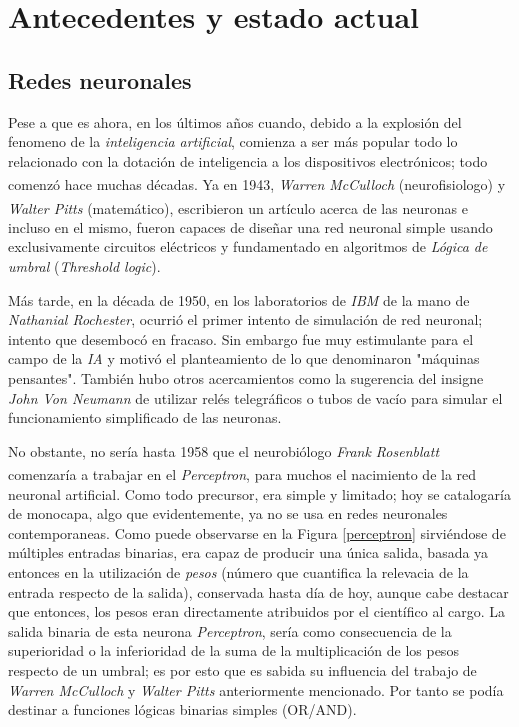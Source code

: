 \chapter{Antecedentes y estado actual}
\section{Redes neuronales}
Pese a que es ahora, en los últimos años cuando, debido a la explosión
del fenomeno de la \textit{inteligencia artificial}, comienza a ser
más popular todo lo relacionado con la dotación de inteligencia a
los dispositivos electrónicos; todo comenzó hace muchas décadas\textsuperscript{\cite{na8}}.
Ya en 1943, \textit{Warren McCulloch} (neurofisiologo) y
\textit{Walter Pitts} (matemático),
escribieron un artículo\textsuperscript{\cite{McCulloch}} acerca de las neuronas e incluso en el mismo,
fueron capaces de diseñar una red neuronal simple usando exclusivamente
circuitos eléctricos y fundamentado en algoritmos de \textit{Lógica de umbral}
(\textit{Threshold logic}).


Más tarde, en la década de 1950, en los laboratorios de \textit{IBM} de
la mano de \textit{Nathanial Rochester}, ocurrió el primer
intento de simulación de red neuronal; intento que desembocó en fracaso.
Sin embargo fue muy estimulante para el campo de la \textit{IA}
y motivó el planteamiento de lo que denominaron "máquinas pensantes".
También hubo otros acercamientos como la sugerencia del insigne
\textit{John Von Neumann} de utilizar relés telegráficos o
tubos de vacío para simular el funcionamiento simplificado de
las neuronas.


No obstante, no sería hasta 1958 que el neurobiólogo
\textit{Frank Rosenblatt} comenzaría a trabajar en el \textit{Perceptron}\textsuperscript{\cite{Rosenblatt}},
para muchos el nacimiento de la red neuronal artificial. Como todo precursor,
era simple y limitado; hoy se catalogaría de monocapa, algo que evidentemente,
ya no se usa en redes neuronales contemporaneas.
Como puede observarse en la Figura \ref{perceptron} sirviéndose de múltiples entradas binarias, era capaz de producir una
única salida, basada ya entonces en la utilización de \textit{pesos}
(número que cuantifica la relevacia de la entrada respecto de la salida),
conservada hasta día de hoy, aunque cabe destacar que entonces, los pesos
eran directamente atribuidos por el científico al cargo.
La salida binaria de esta neurona \textit{Perceptron},
sería como consecuencia de la superioridad o la inferioridad de la
suma de la multiplicación de los pesos respecto de un umbral; es por esto
que es sabida su influencia del trabajo de \textit{Warren McCulloch} y
\textit{Walter Pitts} anteriormente mencionado. Por tanto se podía destinar
a funciones lógicas binarias simples (OR/AND).


